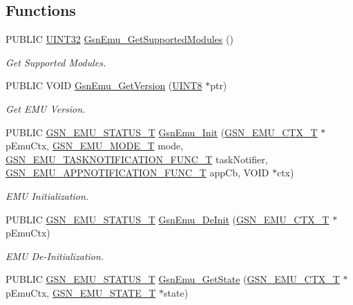 \subsection*{Functions}
\begin{DoxyCompactItemize}
\item 
PUBLIC \hyperlink{a00660_gae1e6edbbc26d6fbc71a90190d0266018}{UINT32} \hyperlink{a00663_ga93436d9f7d75c34e8ed04ecfe64fd85d}{GsnEmu\_\-GetSupportedModules} ()
\begin{DoxyCompactList}\small\item\em Get Supported Modules. \end{DoxyCompactList}\item 
PUBLIC VOID \hyperlink{a00663_ga551937ea94e20c352ead797411954bdf}{GsnEmu\_\-GetVersion} (\hyperlink{a00660_gab27e9918b538ce9d8ca692479b375b6a}{UINT8} $\ast$ptr)
\begin{DoxyCompactList}\small\item\em Get EMU Version. \end{DoxyCompactList}\item 
PUBLIC \hyperlink{a00490_aeda27e2bd7f74b1b9748e313d272033e}{GSN\_\-EMU\_\-STATUS\_\-T} \hyperlink{a00663_ga2cffc4817a2de4ab6d96a6f9d6af298c}{GsnEmu\_\-Init} (\hyperlink{a00059}{GSN\_\-EMU\_\-CTX\_\-T} $\ast$pEmuCtx, \hyperlink{a00663_gafbaa4d30aa4b736f3465344d6a5935b0}{GSN\_\-EMU\_\-MODE\_\-T} mode, \hyperlink{a00490_a05b3306759ea16994bc2d9055424367e}{GSN\_\-EMU\_\-TASKNOTIFICATION\_\-FUNC\_\-T} taskNotifier, \hyperlink{a00489_ab0fa7e48e947d0a8dd37314d7aee6ba7}{GSN\_\-EMU\_\-APPNOTIFICATION\_\-FUNC\_\-T} appCb, VOID $\ast$ctx)
\begin{DoxyCompactList}\small\item\em EMU Initialization. \end{DoxyCompactList}\item 
PUBLIC \hyperlink{a00490_aeda27e2bd7f74b1b9748e313d272033e}{GSN\_\-EMU\_\-STATUS\_\-T} \hyperlink{a00663_ga24d2ae83a520429e6c8d5070a84244f7}{GsnEmu\_\-DeInit} (\hyperlink{a00059}{GSN\_\-EMU\_\-CTX\_\-T} $\ast$pEmuCtx)
\begin{DoxyCompactList}\small\item\em EMU De-\/Initialization. \end{DoxyCompactList}\item 
PUBLIC \hyperlink{a00490_aeda27e2bd7f74b1b9748e313d272033e}{GSN\_\-EMU\_\-STATUS\_\-T} \hyperlink{a00663_gaf76a2b11343bf595609446ea8926ba4a}{GsnEmu\_\-GetState} (\hyperlink{a00059}{GSN\_\-EMU\_\-CTX\_\-T} $\ast$pEmuCtx, \hyperlink{a00663_gab09444b3018b5461230d789c746b56a0}{GSN\_\-EMU\_\-STATE\_\-T} $\ast$state)

\end{DoxyCompactItemize}
